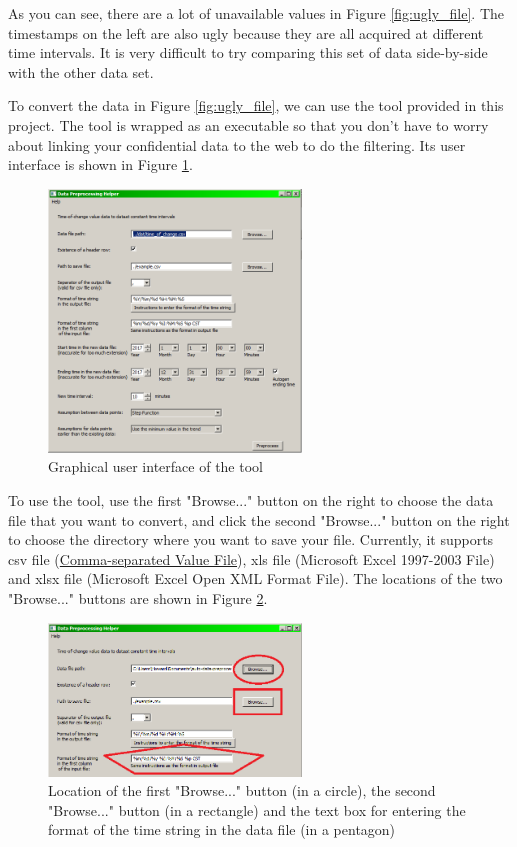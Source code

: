 \documentclass[12pt,a4paper]{article}
\begin{document}
As you can see, there are a lot of unavailable values in Figure \ref{fig:ugly_file}.
The timestamps on the left are also ugly because they are all acquired at different time intervals.
It is very difficult to try comparing this set of data side-by-side with the other data set.

To convert the data in Figure \ref{fig:ugly_file}, we can use the tool provided in this project.
The tool is wrapped as an executable so that you don't have to worry about linking your confidential data to the web to do the filtering.
Its user interface is shown in Figure \ref{fig:ui}.

\begin{figure}[H]
\centering
\includegraphics[width=0.6\textwidth]{ui.png}
\caption{Graphical user interface of the tool}
\label{fig:ui}
\end{figure}

To use the tool, use the first "Browse..." button on the right to choose the data file that you want to convert, and click the second "Browse..." button on the right to choose the directory where you want to save your file. Currently, it supports csv file (\href{https://en.wikipedia.org/wiki/Comma-separated_values}{Comma-separated Value File}), xls file (Microsoft Excel 1997-2003 File) and xlsx file (Microsoft Excel Open XML Format File). The locations of the two "Browse..." buttons are shown in Figure \ref{fig:ui_zoomed}.

\begin{figure}[H]
\centering
\includegraphics[width=0.6\textwidth]{ui_zoomed.png}
\caption{Location of the first "Browse..." button (in a circle), the second "Browse..." button (in a rectangle) and the text box for entering the format of the time string in the data file (in a pentagon)}
\label{fig:ui_zoomed}
\end{figure}
\end{document}
